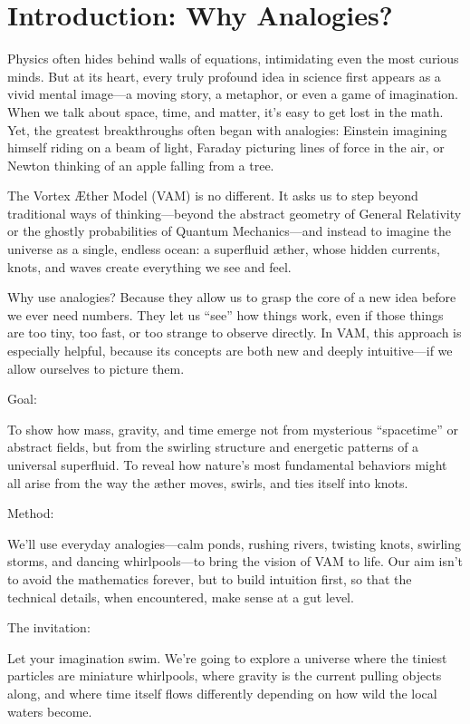 

\section{Introduction: Why Analogies?}

Physics often hides behind walls of equations, intimidating even the most curious minds. But at its heart, every truly profound idea in science first appears as a vivid mental image—a moving story, a metaphor, or even a game of imagination. When we talk about space, time, and matter, it’s easy to get lost in the math. Yet, the greatest breakthroughs often began with analogies: Einstein imagining himself riding on a beam of light, Faraday picturing lines of force in the air, or Newton thinking of an apple falling from a tree.


The Vortex Æther Model (VAM) is no different. It asks us to step beyond traditional ways of thinking—beyond the abstract geometry of General Relativity or the ghostly probabilities of Quantum Mechanics—and instead to imagine the universe as a single, endless ocean: a superfluid æther, whose hidden currents, knots, and waves create everything we see and feel.


Why use analogies? Because they allow us to grasp the core of a new idea before we ever need numbers. They let us “see” how things work, even if those things are too tiny, too fast, or too strange to observe directly. In VAM, this approach is especially helpful, because its concepts are both new and deeply intuitive—if we allow ourselves to picture them.


Goal:

To show how mass, gravity, and time emerge not from mysterious “spacetime” or abstract fields, but from the swirling structure and energetic patterns of a universal superfluid. To reveal how nature’s most fundamental behaviors might all arise from the way the æther moves, swirls, and ties itself into knots.


Method:

We’ll use everyday analogies—calm ponds, rushing rivers, twisting knots, swirling storms, and dancing whirlpools—to bring the vision of VAM to life. Our aim isn’t to avoid the mathematics forever, but to build intuition first, so that the technical details, when encountered, make sense at a gut level.


The invitation:

Let your imagination swim. We’re going to explore a universe where the tiniest particles are miniature whirlpools, where gravity is the current pulling objects along, and where time itself flows differently depending on how wild the local waters become.